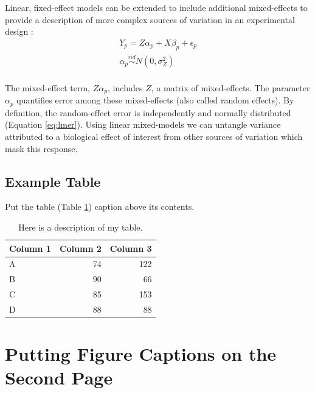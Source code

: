\documentclass[PhD]{dukethesis}
\begin{document}
Linear, fixed-effect models can be extended to include additional mixed-effects
to provide a description of more complex sources of variation in an experimental
design \cite{Bates2015}:
\begin{equation}
	\begin{gathered}
		\label{eq:lmer}
		Y_{p} =  Z\alpha_{p} + X\beta_{p} + \epsilon_{p} \\
		\alpha_{p} \stackrel{iid}{\sim} N(0,\sigma_{Z}^2) \\
	\end{gathered}
\end{equation}

The mixed-effect term, $Z\alpha_{p}$, includes $Z$, a matrix of mixed-effects.
The parameter $\alpha_{p}$ quantifies error among these mixed-effects (also
called random effects).  By definition, the random-effect error is independently
and normally distributed (Equation \ref{eq:lmer}). Using linear mixed-models we
can untangle variance attributed to a biological effect of interest from other
sources of variation which mask this response.


\section{Example Table}

Put the table (Table \ref{table:example}) caption above its contents.

\begin{table}[ht]
	\caption[This is my table's caption.]{
		Here is a description of my table.}
	\begin{tabular}{lrr}
		\hline
		\textbf{Column 1} & \textbf{Column 2} & \textbf{Column 3} \\
		\hline
		A & 74 & 122\\
		B & 90 & 66\\
		C & 85 & 153\\
		D & 88 & 88\\
		\hline
	\end{tabular}
	\label{table:example}
\end{table}



\chapter{Putting Figure Captions on the Second Page}
\label{chap:04}
\end{document}
